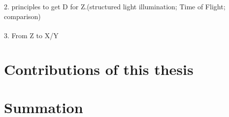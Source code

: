 2. principles to get D for Z.(structured light illumination; Time of Flight; comparison)\\\\
3. From Z to X/Y

\section{Contributions of this thesis}
\section{Summation}













































